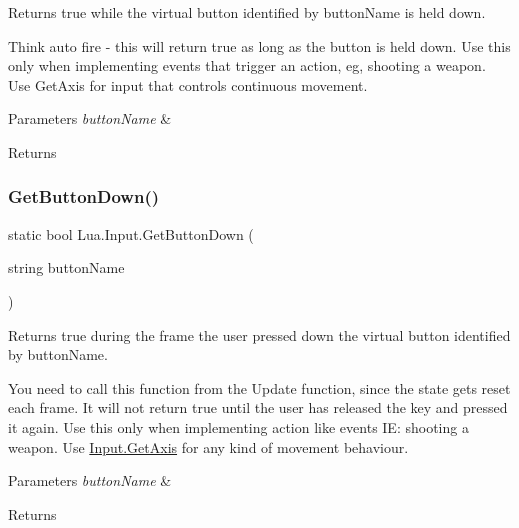 Returns true while the virtual button identified by button\+Name is held down. 

Think auto fire -\/ this will return true as long as the button is held down. Use this only when implementing events that trigger an action, eg, shooting a weapon. Use Get\+Axis for input that controls continuous movement. 
\begin{DoxyParams}{Parameters}
{\em button\+Name} & \\
\hline
\end{DoxyParams}
\begin{DoxyReturn}{Returns}

\end{DoxyReturn}
\mbox{\label{class_lua_1_1_input_a59b2338d29a39f0694aebef890598b7c}} 
\subsubsection{\texorpdfstring{GetButtonDown()}{GetButtonDown()}}
{\footnotesize\ttfamily static bool Lua.\+Input.\+Get\+Button\+Down (\begin{DoxyParamCaption}\item[{string}]{button\+Name }\end{DoxyParamCaption})\hspace{0.3cm}{\ttfamily [static]}}



Returns true during the frame the user pressed down the virtual button identified by button\+Name. 

You need to call this function from the Update function, since the state gets reset each frame. It will not return true until the user has released the key and pressed it again. Use this only when implementing action like events IE\+: shooting a weapon. Use \mbox{\hyperlink{class_lua_1_1_input_a616e22e4f3b9c973c9763c10dc495395}{Input.\+Get\+Axis}} for any kind of movement behaviour. 
\begin{DoxyParams}{Parameters}
{\em button\+Name} & \\
\hline
\end{DoxyParams}
\begin{DoxyReturn}{Returns}

\end{DoxyReturn}
\mbox{\label{class_lua_1_1_input_a74cdd1903a2b531d575a20ea9cbb0ec0}} 
